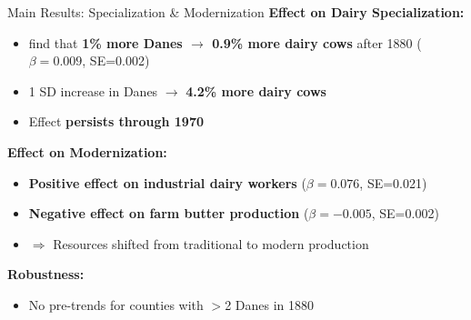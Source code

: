\documentclass{beamer}
\begin{document}
\begin{frame}{Main Results: Specialization \& Modernization}
\textbf{Effect on Dairy Specialization:}
\begin{itemize}
    \item \textcite{bobergfazlic2024immigrant} find that \textbf{1\% more Danes $\rightarrow$ 0.9\% more dairy cows} after 1880 ($\beta = 0.009$, SE=0.002)
    \item 1 SD increase in Danes $\rightarrow$ \textbf{4.2\% more dairy cows}
    \item Effect \textbf{persists through 1970}
\end{itemize}

\vspace{0.3cm}
\textbf{Effect on Modernization:}
\begin{itemize}
    \item \textbf{Positive effect on industrial dairy workers} ($\beta = 0.076$, SE=0.021)
    \item \textbf{Negative effect on farm butter production} ($\beta = -0.005$, SE=0.002)
    \item $\Rightarrow$ Resources shifted from traditional to modern production
\end{itemize}

\vspace{0.3cm}
\textbf{Robustness:}
\begin{itemize}
    \item No pre-trends for counties with $>$2 Danes in 1880
\end{itemize}
\end{frame}
\end{document}
